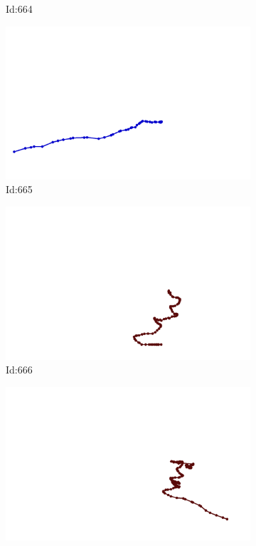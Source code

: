 \documentclass[12pt,twoside]{report}
\begin{document}
\begin{figure}
\begin{subfigure}[b]{0.20\textwidth}
\caption{Id:664}
\end{subfigure}
\begin{subfigure}[b]{0.20\textwidth}
\centering
\includegraphics[width=\textwidth]{../trajectories/665.png}
\caption{Id:665}
\end{subfigure}
\begin{subfigure}[b]{0.20\textwidth}
\centering
\includegraphics[width=\textwidth]{../trajectories/666.png}
\caption{Id:666}
\end{subfigure}
\begin{subfigure}[b]{0.20\textwidth}
\centering
\includegraphics[width=\textwidth]{../trajectories/687.png}

\end{subfigure}
\end{figure}
\end{document}
